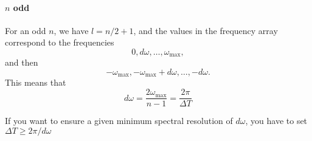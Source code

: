 \paragraph{$n$ odd}
For an odd $n$, we have $l=n/2 + 1$, and the values in the frequency array correspond
to the frequencies $$0, d\omega, \dots, \omega_{\max},$$ and then
$$-\omega_{\max}, -\omega_{\max}+d\omega, \dots, -d\omega.$$ This means that
\begin{equation}
  d\omega = \frac{2 \omega_{\max}}{n-1} = \frac{2\pi}{\Delta T}
\end{equation}

If you want to ensure a given minimum spectral resolution of $d\omega$, you
have to set $\Delta T \geq 2 \pi / d \omega$

